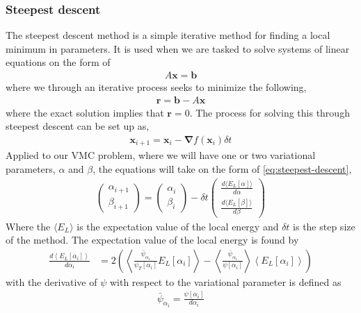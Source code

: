 \documentclass[11pt]{article}
\newcommand{\expect}[1]{\left\langle{#1}\right\rangle}
\begin{document}
\subsubsection{Steepest descent}
The steepest descent method is a simple iterative method for finding a local minimum in parameters. It is used when we are tasked to solve systems of linear equations on the form of
\begin{align*}
	A \mathbf{x} = \mathbf{b}
\end{align*}
where we through an iterative process seeks to minimize the following,
\begin{align*}
	\mathbf{r} = \mathbf{b} - A \mathbf{x}
\end{align*}
where the exact solution implies that $\mathbf{r}=0$. The process for solving this through steepest descent can be set up as, 
\begin{align}
	\mathbf{x}_{i+1} = \mathbf{x}_i - \bm{\nabla} f(\mathbf{x}_i) \delta t
	\label{eq:steepest-descent}
\end{align}
Applied to our VMC problem, where we will have one or two variational parameters, $\alpha$ and $\beta$, the equations will take on the form of \eqref{eq:steepest-descent},
\begin{align}
	\begin{pmatrix}
		\alpha_{i+1} \\
		\beta_{i+1}
	\end{pmatrix}
	=
	\begin{pmatrix}
		\alpha_{i} \\
		\beta_{i}
	\end{pmatrix}
	- \delta t
	\begin{pmatrix}
		\frac{d\langle E_L[\alpha] \rangle}{d\alpha} \\
		\frac{d\langle E_L[\beta] \rangle}{d\beta}
	\end{pmatrix}
\end{align}
Where the $\langle E_L \rangle$ is the expectation value of the local energy and $\delta t$ is the step size of the method. The expectation value of the local energy is found by
\begin{align}
	\frac{d\expect{E_L[\alpha_i]}}{d\alpha_i} &= 2 \left( \expect{ \frac{\bar{\psi}_{\alpha_i}}{\psi_T[\alpha_i]}E_L[\alpha_i] } - \expect{\frac{\bar{\psi}_{\alpha_i}}{\psi[\alpha_i]}}\expect{E_L[\alpha_i]} \right)
	\label{eq:local-energy-variational-derivative}
\end{align}
with the derivative of $\psi$ with respect to the variational parameter is defined as
\begin{align*}
	\bar{\psi}_{\alpha_i} = \frac{\psi[\alpha_i]}{d\alpha_i}
\end{align*}
\end{document}
